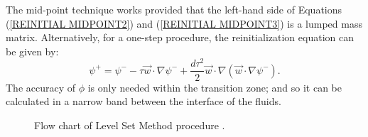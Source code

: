 The mid-point technique works provided that the left-hand side of Equations (\ref{REINITIAL MIDPOINT2}) and (\ref{REINITIAL MIDPOINT3}) is a lumped mass matrix. Alternatively, for a one-step procedure, the reinitialization equation can be given by:
%
\begin{equation}
\psi^{+} = \psi^{-} - \tau \vec{w} \cdot \nabla \psi^{-} + \frac{d \tau^{2}}{2} \vec{w} \cdot \nabla(\vec{w} \cdot \nabla \psi^{-}).
\label{REINITIAL ONESTEP}
\end{equation}
%
The accuracy of $\phi$ is only needed within the transition zone; and so it can be calculated in a narrow band between the interface of the fluids. 
%
\begin{figure}
\center
{}
\caption{Flow chart of Level Set Method procedure \cite{LIN2005}.}
\label{LEVELSET FLOWCHART}
\end{figure}
